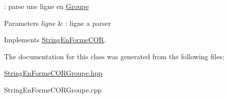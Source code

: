 \+: parse une ligne en \mbox{\hyperlink{class_groupe}{Groupe}} 


\begin{DoxyParams}{Parameters}
{\em ligne} & \+: ligne a parser \\
\hline
\end{DoxyParams}


Implements \mbox{\hyperlink{class_string_en_forme_c_o_r}{String\+En\+Forme\+C\+OR}}.



The documentation for this class was generated from the following files\+:\begin{DoxyCompactItemize}
\item 
\mbox{\hyperlink{_string_en_forme_c_o_r_groupe_8hpp}{String\+En\+Forme\+C\+O\+R\+Groupe.\+hpp}}\item 
String\+En\+Forme\+C\+O\+R\+Groupe.\+cpp\end{DoxyCompactItemize}
